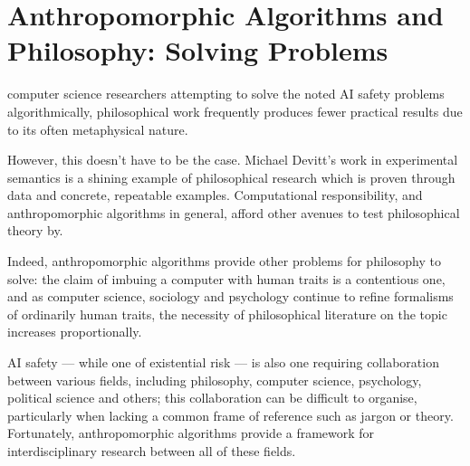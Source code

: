 \section{Anthropomorphic Algorithms and Philosophy: Solving Problems}

 computer science researchers attempting to solve the noted AI safety problems algorithmically, philosophical work frequently produces fewer practical results due to its often metaphysical nature.\par

However, this doesn't have to be the case. Michael Devitt's work in experimental semantics\cite{experimental_semantics} is a shining example of philosophical research which is proven through data and concrete, repeatable examples. Computational responsibility, and anthropomorphic algorithms in general, afford other avenues to test philosophical theory by.\par

Indeed, anthropomorphic algorithms provide other problems for philosophy to solve: the claim of imbuing a computer with human traits is a contentious one, and as computer science, sociology and psychology continue to refine formalisms of ordinarily human traits, the necessity of philosophical literature on the topic increases proportionally.\par
 AI safety --- while one of existential risk --- is also one requiring collaboration between various fields, including philosophy, computer science, psychology, political science and others; this collaboration can be difficult to organise, particularly when lacking a common frame of reference such as jargon or theory. Fortunately, anthropomorphic algorithms provide a framework for interdisciplinary research between all of these fields.\par

